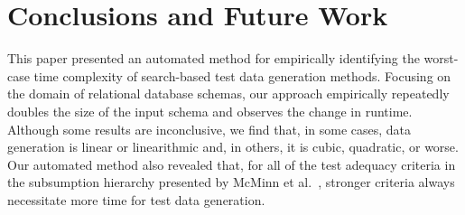 
\section{Conclusions and Future Work}


This paper presented an automated method for empirically identifying the worst-case time complexity of search-based test
data generation methods. Focusing on the domain of relational database schemas, our approach empirically repeatedly
doubles the size of the input schema and observes the change in runtime. Although some results are inconclusive, we find
that, in some cases, data generation is linear or linearithmic and, in others, it is cubic, quadratic, or worse.  Our
automated method also revealed that, for all of the test adequacy criteria in the subsumption hierarchy presented by
McMinn et al.~\cite{mcminn2015}, stronger criteria always necessitate more time for test data generation.
